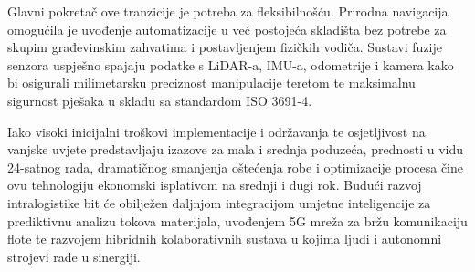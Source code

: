 \documentclass[12pt,a4paper]{article}
\begin{document}
Glavni pokretač ove tranzicije je potreba za fleksibilnošću. Prirodna navigacija omogućila je uvođenje automatizacije u već postojeća skladišta bez potrebe za skupim građevinskim zahvatima i postavljenjem fizičkih vodiča. Sustavi fuzije senzora uspješno spajaju podatke s LiDAR-a, IMU-a, odometrije i kamera kako bi osigurali milimetarsku preciznost manipulacije teretom te maksimalnu sigurnost pješaka u skladu sa standardom ISO 3691-4.

Iako visoki inicijalni troškovi implementacije i održavanja te osjetljivost na vanjske uvjete predstavljaju izazove za mala i srednja poduzeća, prednosti u vidu 24-satnog rada, dramatičnog smanjenja oštećenja robe i optimizacije procesa čine ovu tehnologiju ekonomski isplativom na srednji i dugi rok. Budući razvoj intralogistike bit će obilježen daljnjom integracijom umjetne inteligencije za prediktivnu analizu tokova materijala, uvođenjem 5G mreža za bržu komunikaciju flote te razvojem hibridnih kolaborativnih sustava u kojima ljudi i autonomni strojevi rade u sinergiji.
\end{document}
